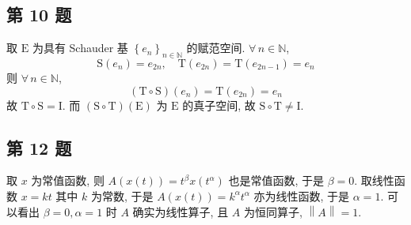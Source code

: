 \documentclass[\ROOT/main.tex]{subfiles}
\begin{document}
\subsection{第 10 题}
取 $\mathrm{E}$ 为具有 Schauder 基 $\left\{ e_n \right\}_{n \in \mathbb{N}}$ 的赋范空间.
$\forall \, n \in \mathbb{N}$,
\[
    \mathrm{S} \left( e_n \right) = e_{2n}
    , \quad
    \mathrm{T} \left( e_{2n} \right) = \mathrm{T} \left( e_{2n - 1} \right) = e_n
\]
则 $\forall \, n \in \mathbb{N}$,
\[
    \left( \mathrm{T} \circ \mathrm{S} \right) \left( e_n \right) = \mathrm{T} \left( e_{2 n} \right) = e_n
\]
故 $\mathrm{T} \circ \mathrm{S} = \mathrm{I}$.
而 $\left( \mathrm{S} \circ \mathrm{T} \right) \left( \mathrm{E} \right)$ 为 $\mathrm{E}$ 的真子空间, 故 $\mathrm{S} \circ \mathrm{T} \neq \mathrm{I}$.

\subsection{第 12 题}
取 $x$ 为常值函数, 则 $A \left( x \left( t \right) \right) = t^\beta x \left( t^\alpha \right)$ 也是常值函数, 于是 $\beta = 0$.
取线性函数 $x = k t$ 其中 $k$ 为常数, 于是 $A \left( x \left( t \right) \right) = k^\alpha t^\alpha$ 亦为线性函数, 于是 $\alpha = 1$.
可以看出 $\beta = 0, \alpha = 1$ 时 $A$ 确实为线性算子, 且 $A$ 为恒同算子, $\left\| A \right\| = 1$.
\end{document}
